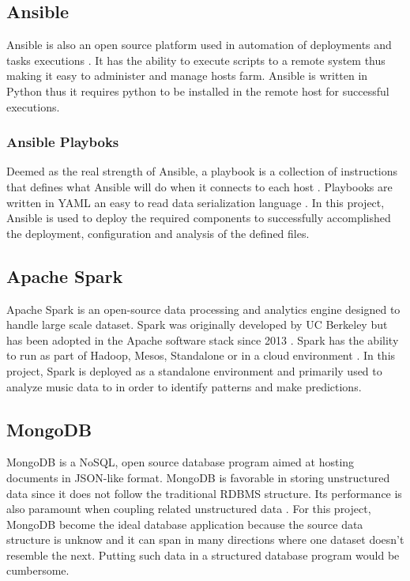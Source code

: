 \documentclass[9pt,twocolumn,twoside]{../../styles/osajnl}
\begin{document}
\subsection{Ansible}

Ansible is also an open source platform used in automation of
deployments and tasks executions  \cite{ansible} . It has the ability to
execute scripts to a remote system thus making it easy to administer
and manage hosts farm. Ansible is written in Python thus it requires
python to be installed in the remote host for successful executions.

\subsubsection{Ansible Playboks}

Deemed as the real strength of Ansible, a playbook is a collection of
instructions that defines what Ansible will do when it connects to
each host \cite{docansible} . Playbooks are written in YAML an easy to
read data serialization language  \cite{yaml} . In this project, Ansible
is used to deploy the required components to successfully accomplished
the deployment, configuration and analysis of the defined files. 

\subsection{Apache Spark}

Apache Spark is an open-source data processing and analytics engine
designed to handle large scale dataset. Spark was originally developed
by UC Berkeley but has been adopted in the Apache software stack since
2013  \cite{amplab}. Spark has the ability to run as part of Hadoop,
Mesos, Standalone or in a cloud environment  \cite{spark}. In this
project, Spark is deployed as a standalone environment and primarily
used to analyze music data to in order to identify patterns and make
predictions.

\subsection{MongoDB}

MongoDB is a NoSQL, open source database program aimed at hosting
documents in JSON-like format. MongoDB is favorable in storing
unstructured data since it does not follow the traditional RDBMS
structure. Its performance is also paramount when coupling related
unstructured data  \cite{mongod}. For this project, MongoDB become the
ideal database application because the source data structure is unknow
and it can span in many directions where one dataset doesn’t resemble
the next. Putting such data in a structured database program would be
cumbersome.
\end{document}
